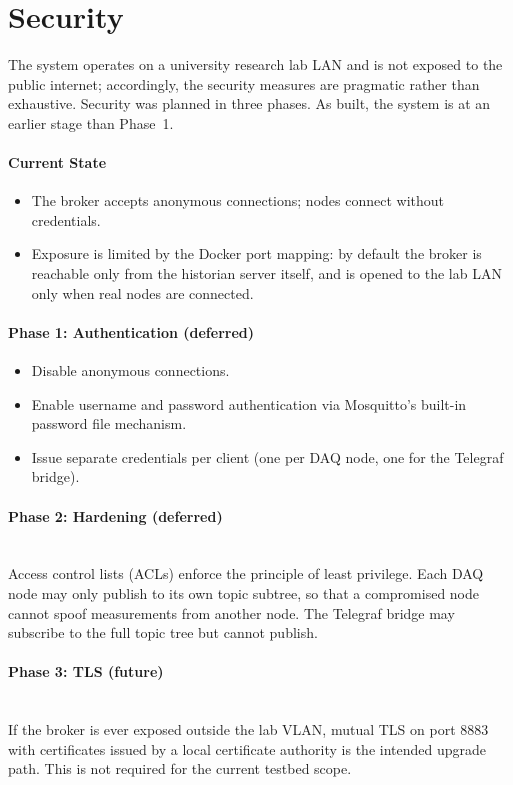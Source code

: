 \section{Security}
\label{sec:security}
The system operates on a university research lab LAN and is not exposed to the public internet; accordingly, the security measures are pragmatic rather than exhaustive. Security was planned in three phases. As built, the system is at an earlier stage than Phase~1.

\paragraph{Current State}
\begin{itemize}[noitemsep]
  \item The broker accepts anonymous connections; nodes connect without credentials.
  \item Exposure is limited by the Docker port mapping: by default the broker is reachable only from the historian server itself, and is opened to the lab LAN only when real nodes are connected.
\end{itemize}

\paragraph{Phase 1: Authentication (deferred)}
\begin{itemize}[noitemsep]
  \item Disable anonymous connections.
  \item Enable username and password authentication via Mosquitto's built-in password file mechanism.
  \item Issue separate credentials per client (one per DAQ node, one for the Telegraf bridge).
\end{itemize}

\paragraph{Phase 2: Hardening (deferred)} ~\\
Access control lists (ACLs) enforce the principle of least privilege. Each DAQ node may only publish to its own topic subtree, so that a compromised node cannot spoof measurements from another node. The Telegraf bridge may subscribe to the full topic tree but cannot publish.

\paragraph{Phase 3: TLS (future)} ~\\
If the broker is ever exposed outside the lab VLAN, mutual TLS on port 8883 with certificates issued by a local certificate authority is the intended upgrade path. This is not required for the current testbed scope.
